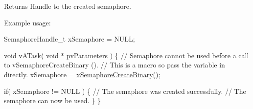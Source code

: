 \begin{DoxyReturn}{Returns}
Handle to the created semaphore.
\end{DoxyReturn}
Example usage\+: 
\begin{DoxyPre}
SemaphoreHandle\_t xSemaphore = NULL;\end{DoxyPre}



\begin{DoxyPre}void vATask( void * pvParameters )
\{
   // Semaphore cannot be used before a call to vSemaphoreCreateBinary ().
   // This is a macro so pass the variable in directly.
   xSemaphore = \hyperlink{semphr_8h_acba963695e4f159d9bfa2394cae5badc}{xSemaphoreCreateBinary()};\end{DoxyPre}



\begin{DoxyPre}   if( xSemaphore != NULL )
   \{
       // The semaphore was created successfully.
       // The semaphore can now be used.
   \}
\}
\end{DoxyPre}
 